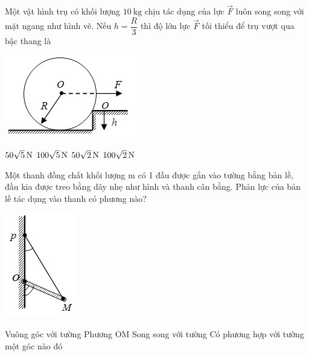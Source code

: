 \begin{ex}
Một vật hình trụ có khối lượng $\SI{10}{\kilogram}$ chịu tác dụng của lực $\vec F$ luôn song song với mặt ngang như hình vẽ. Nếu $h=\dfrac{R}{3}$ thì độ lớn lực $\vec F$ tối thiểu để trụ vượt qua bậc thang là
\begin{center}
	\includegraphics[width=0.25\linewidth]{../figs/VN10-2023-PH-TP0005-13}
\end{center}	
	\choice
	{\True $\xsi{50\sqrt{5}}{\newton}$}
	{$\xsi{100\sqrt{5}}{\newton}$}
	{$\xsi{50\sqrt{2}}{\newton}$}
	{$\xsi{100\sqrt{2}}{\newton}$}
\end{ex}
\begin{ex}
	Một thanh đồng chất khối lượng m có 1 đầu được gắn vào tường bằng bản lề, đầu kia được treo bằng dây nhẹ như hình và thanh cân bằng. Phản lực của bản lề tác dụng vào thanh có phương nào?
	\begin{center}
		\includegraphics[width=0.15\linewidth]{../figs/VN10-2023-PH-TP0005-11}
	\end{center}
	\choice
	{Vuông góc với tường}
	{Phương OM}
	{Song song với tường}
	{\True Có phương hợp với tường một góc nào đó}
	\loigiai{}
\end{ex}
